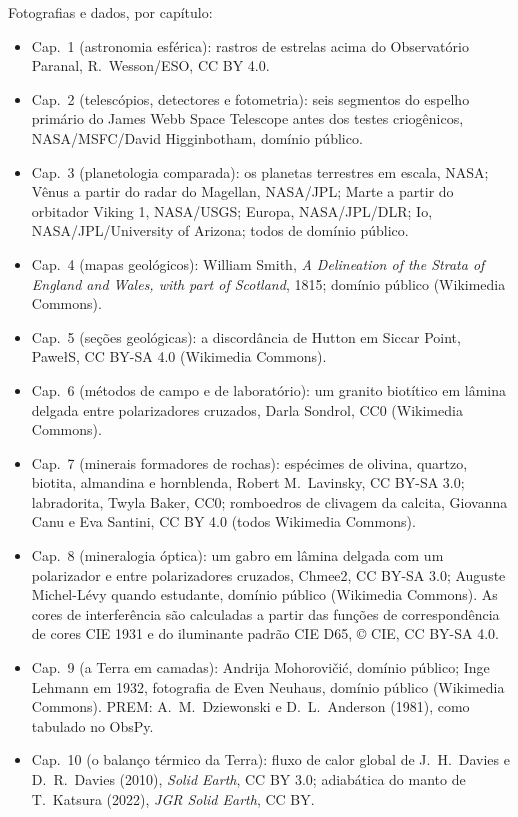 \bigskip
\noindent Fotografias e dados, por capítulo:
\begin{itemize}\small
  \item Cap.~1 (astronomia esférica): rastros de estrelas acima do Observatório Paranal, R.~Wesson/ESO, CC BY 4.0.
  \item Cap.~2 (telescópios, detectores e fotometria): seis segmentos do espelho primário do James Webb Space Telescope antes dos testes criogênicos, NASA/MSFC/David Higginbotham, domínio público.
  \item Cap.~3 (planetologia comparada): os planetas terrestres em escala, NASA; Vênus a partir do radar do Magellan, NASA/JPL; Marte a partir do orbitador Viking 1, NASA/USGS; Europa, NASA/JPL/DLR; Io, NASA/JPL/University of Arizona; todos de domínio público.
  \item Cap.~4 (mapas geológicos): William Smith, \emph{A Delineation of the Strata of England and Wales, with part of Scotland}, 1815; domínio público (Wikimedia Commons).
  \item Cap.~5 (seções geológicas): a discordância de Hutton em Siccar Point, PawełS, CC BY-SA 4.0 (Wikimedia Commons).
  \item Cap.~6 (métodos de campo e de laboratório): um granito biotítico em lâmina delgada entre polarizadores cruzados, Darla Sondrol, CC0 (Wikimedia Commons).
  \item Cap.~7 (minerais formadores de rochas): espécimes de olivina, quartzo, biotita, almandina e hornblenda, Robert M.~Lavinsky, CC BY-SA 3.0; labradorita, Twyla Baker, CC0; romboedros de clivagem da calcita, Giovanna Canu e Eva Santini, CC BY 4.0 (todos Wikimedia Commons).
  \item Cap.~8 (mineralogia óptica): um gabro em lâmina delgada com um polarizador e entre polarizadores cruzados, Chmee2, CC BY-SA 3.0; Auguste Michel-Lévy quando estudante, domínio público (Wikimedia Commons). As cores de interferência são calculadas a partir das funções de correspondência de cores CIE 1931 e do iluminante padrão CIE D65, \copyright{} CIE, CC BY-SA 4.0.
  \item Cap.~9 (a Terra em camadas): Andrija Mohorovičić, domínio público; Inge Lehmann em 1932, fotografia de Even Neuhaus, domínio público (Wikimedia Commons). PREM: A.~M.~Dziewonski e D.~L.~Anderson (1981), como tabulado no ObsPy.
  \item Cap.~10 (o balanço térmico da Terra): fluxo de calor global de J.~H.~Davies e D.~R.~Davies (2010), \emph{Solid Earth}, CC BY 3.0; adiabática do manto de T.~Katsura (2022), \emph{JGR Solid Earth}, CC BY.

\end{itemize}
